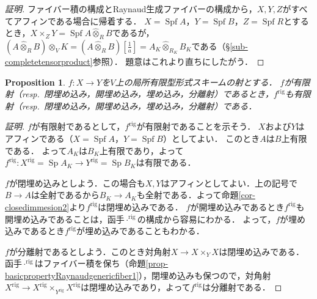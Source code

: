 \documentclass[a4paper,12pt, dvipdfmx]{jsbook}
\def\rig{\mathop{\mathrm{rig}}\nolimits}
\def\Spf{\mathop{\mathrm{Spf}}\nolimits}
\def\Sp{\mathop{\mathrm{Sp}}\nolimits}
\theoremstyle{plain}
\newtheorem{prop}[thm]{\bfseries Proposition}
\theoremstyle{definition}
\begin{document}
\begin{proof}[証明]
ファイバー積の構成とRaynaud生成ファイバーの構成から，$X,Y,Z$がすべてアフィンである場合に帰着する．
$X=\Spf A$，$Y=\Spf B$，$Z=\Spf R$とするとき，$X\times_ZY=\Spf A\widehat{\otimes}_RB$であるが，$(A\widehat{\otimes}_RB)\otimes_VK=(A\widehat{\otimes}_RB)[\frac{1}{a}]=A_K\widehat{\otimes}_{R_K}B_K$である（\S\ref{sub-completetensorproduct}参照）．
題意はこれより直ちにしたがう．
\end{proof}

\begin{prop}\label{prop-basicpropertyRaynaudgenericfiber2}{\rm 
$f\colon X\rightarrow Y$を$V$上の局所有限型形式スキームの射とする．
$f$が有限射（resp.\ 閉埋め込み，開埋め込み，埋め込み，分離射）であるとき，$f^{\rig}$も有限射（resp.\ 閉埋め込み，開埋め込み，埋め込み，分離射）である．}
\end{prop}

\begin{proof}[証明]
$f$が有限射であるとして，$f^{\rig}$が有限射であることを示そう．
$X$および$Y$はアフィンである（$X=\Spf A$，$Y=\Spf B$）としてよい．
このとき$A$は$B$上有限である．
よって$A_K$は$B_K$上有限であり，よって$f^{\rig}\colon X^{\rig}=\Sp A_K\rightarrow Y^{\rig}=\Sp B_K$は有限である．

$f$が閉埋め込みとしよう．この場合も$X,Y$はアフィンとしてよい．上の記号で$B\rightarrow A$は全射であるから$B_K\rightarrow A_K$も全射である．よって命題\ref{cor-closedimmesion2}より$f^{\rig}$は閉埋め込みである．
$f$が開埋め込みであるとき$f^{\rig}$も開埋め込みであることは，函手$\cdot^{\rig}$の構成から容易にわかる．
よって，$f$が埋め込みであるとき$f^{\rig}$が埋め込みであることもわかる．

$f$が分離射であるとしよう．このとき対角射$X\rightarrow X\times_YX$は閉埋め込みである．
函手$\cdot^{\rig}$はファイバー積を保ち（命題\ref{prop-basicpropertyRaynaudgenericfiber1}），閉埋め込みも保つので，対角射$X^{\rig}\rightarrow X^{\rig}\times_{Y^{\rig}}X^{\rig}$は閉埋め込みであり，よって$f^{\rig}$は分離射である．
\end{proof}
\end{document}
